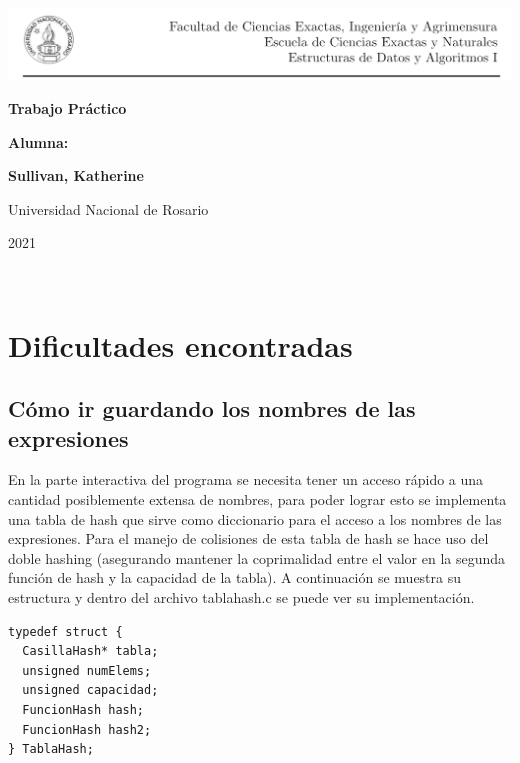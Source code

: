 \documentclass[11pt]{article}
\begin{document}
\begin{titlepage}
    \hspace{-1.2cm}\includegraphics[scale= 0.8]{header2.png}
    \begin{center}
        \vfill
        \vfill
            \vspace{0.7cm}
            \noindent\textbf{\Huge Trabajo Práctico}\par
            \vspace{.5cm}
        \vfill
        \noindent \textbf{\huge Alumna:}\par
        \vspace{.5cm}
        \noindent \textbf{\Large Sullivan, Katherine}\par
 
        \vfill
        \large Universidad Nacional de Rosario \par
        \noindent\large 2021
    \end{center}
\end{titlepage}
\

\section{Dificultades encontradas}

\subsection{C\'omo ir guardando los nombres de las expresiones}
En la parte interactiva del programa se necesita tener un acceso r\'apido a una cantidad posiblemente extensa de nombres, para poder lograr esto se implementa una tabla de hash que sirve como diccionario para el acceso a los nombres de las expresiones. Para el manejo de colisiones de esta tabla de hash se hace uso del doble hashing (asegurando mantener la coprimalidad entre el valor en la segunda función de hash y la capacidad de la tabla). 
A continuaci\'on se muestra su estructura y dentro del archivo tablahash.c se puede ver su implementaci\'on. 

\begin{lstlisting}[style = CStyle]
typedef struct {
  CasillaHash* tabla;
  unsigned numElems;
  unsigned capacidad;
  FuncionHash hash;
  FuncionHash hash2;
} TablaHash;
\end{lstlisting}
\end{document}
